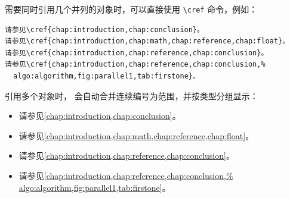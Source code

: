 需要同时引用几个并列的对象时，可以直接使用 \verb|\cref| 命令，例如：
\begin{Verbatim}
请参见\cref{chap:introduction,chap:conclusion}。
请参见\cref{chap:introduction,chap:math,chap:reference,chap:float}。
请参见\cref{chap:introduction,chap:reference,chap:conclusion}。
请参见\cref{chap:introduction,chap:reference,chap:conclusion,%
  algo:algorithm,fig:parallel1,tab:firstone}。
\end{Verbatim}

引用多个对象时， 会自动合并连续编号为范围，并按类型分组显示：
\begin{itemize}
  \item 请参见\cref{chap:introduction,chap:conclusion}。
  \item 请参见\cref{chap:introduction,chap:math,chap:reference,chap:float}。
  \item 请参见\cref{chap:introduction,chap:reference,chap:conclusion}。
  \item 请参见\cref{chap:introduction,chap:reference,chap:conclusion,%
        algo:algorithm,fig:parallel1,tab:firstone}。
\end{itemize}
